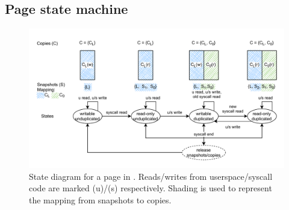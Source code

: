 \documentclass[letterpaper,twocolumn,10pt, anonymous]{article}
\begin{document}
\subsection{Page state machine}

\begin{figure}[]
  \includegraphics[width=\linewidth]{img/tiktok_states.pdf}
  \caption{State diagram for a page in \tiktok. Reads/writes from userspace/syscall 
          code are marked (u)/(s) respectively. Shading is used to represent the 
          mapping from snapshots to copies.}
  \label{fig:tiktok_states}
\end{figure}
\end{document}
